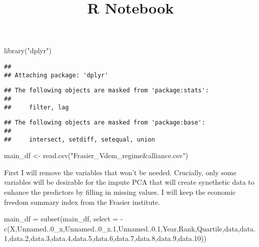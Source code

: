 \documentclass[
]{article}
\title{R Notebook}
\author{}
\date{\vspace{-2.5em}}
\newenvironment{Shaded}{\begin{snugshade}}{\end{snugshade}}
\newcommand{\AttributeTok}[1]{\textcolor[rgb]{0.77,0.63,0.00}{#1}}
\newcommand{\FloatTok}[1]{\textcolor[rgb]{0.00,0.00,0.81}{#1}}
\newcommand{\FunctionTok}[1]{\textcolor[rgb]{0.00,0.00,0.00}{#1}}
\newcommand{\NormalTok}[1]{#1}
\newcommand{\OtherTok}[1]{\textcolor[rgb]{0.56,0.35,0.01}{#1}}
\newcommand{\SpecialCharTok}[1]{\textcolor[rgb]{0.00,0.00,0.00}{#1}}
\newcommand{\StringTok}[1]{\textcolor[rgb]{0.31,0.60,0.02}{#1}}
\begin{document}
\maketitle

\begin{Shaded}
\begin{Highlighting}[]
\FunctionTok{library}\NormalTok{(}\StringTok{"dplyr"}\NormalTok{)}
\end{Highlighting}
\end{Shaded}

\begin{verbatim}
## 
## Attaching package: 'dplyr'
\end{verbatim}

\begin{verbatim}
## The following objects are masked from 'package:stats':
## 
##     filter, lag
\end{verbatim}

\begin{verbatim}
## The following objects are masked from 'package:base':
## 
##     intersect, setdiff, setequal, union
\end{verbatim}

\begin{Shaded}
\begin{Highlighting}[]
\NormalTok{main\_df }\OtherTok{\textless{}{-}} \FunctionTok{read.csv}\NormalTok{(}\StringTok{"Frasier\_Vdem\_regime\&alliance.csv"}\NormalTok{)}
\end{Highlighting}
\end{Shaded}

First I will remove the variables that won't be needed. Crucially, only
some variables will be desirable for the impute PCA that will create
synethetic data to enhance the predictors by filling in missing values.
I will keep the economic freedom summary index from the Frasier
institute.

\begin{Shaded}
\begin{Highlighting}[]
\NormalTok{main\_df }\OtherTok{=} \FunctionTok{subset}\NormalTok{(main\_df, }\AttributeTok{select =} \SpecialCharTok{{-}}\FunctionTok{c}\NormalTok{(X,Unnamed..0\_x,Unnamed..0\_x}\FloatTok{.1}\NormalTok{,Unnamed..}\FloatTok{0.1}\NormalTok{,Year,Rank,Quartile,data,data}\FloatTok{.1}\NormalTok{,data}\FloatTok{.2}\NormalTok{,data}\FloatTok{.3}\NormalTok{,data}\FloatTok{.4}\NormalTok{,data}\FloatTok{.5}\NormalTok{,data}\FloatTok{.6}\NormalTok{,data}\FloatTok{.7}\NormalTok{,data}\FloatTok{.8}\NormalTok{,data}\FloatTok{.9}\NormalTok{,data}\FloatTok{.10}\NormalTok{))}
\end{Highlighting}
\end{Shaded}
\end{document}
